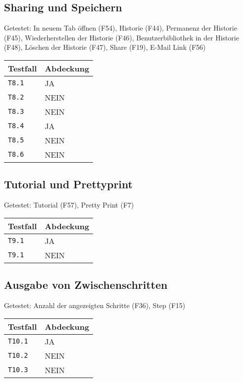 \documentclass[parskip=full,11pt,twoside]{scrartcl}
\newcommand{\testline}[2]{
    \texttt{#1} & \ifthenelse{\equal{#2}{JA}}{\cellcolor{green!20}}{\cellcolor{red!20}}#2 \\ \hline
}
\begin{document}
\subsection{Sharing und Speichern}
    Getestet:
    In neuem Tab öffnen (F54),
    Historie (F44),
    Permanenz der Historie (F45),
    Wiederherstellen der Historie (F46),
    Benutzerbibliothek in der Historie (F48),
    Löschen der Historie (F47),
    Share (F19),
    E-Mail Link (F56)

    \label{shortcuts}
    \begin{center}
        \begin{tabular}{ p{9cm} p{4cm}}
            Testfall & Abdeckung \\ \hline
            \testline{T8.1}{JA}
            \testline{T8.2}{NEIN}
            \testline{T8.3}{NEIN}
            \testline{T8.4}{JA}
            \testline{T8.5}{NEIN}
            \testline{T8.6}{NEIN}
        \end{tabular}
    \end{center}

\subsection{Tutorial und Prettyprint}
    Getestet:
    Tutorial (F57),
    Pretty Print (F7)

    \label{shortcuts}
    \begin{center}
        \begin{tabular}{ p{9cm} p{4cm}}
            Testfall & Abdeckung \\ \hline
            \testline{T9.1}{JA}
            \testline{T9.1}{NEIN}
        \end{tabular}
    \end{center}

\subsection{Ausgabe von Zwischenschritten}
    Getestet:
    Anzahl der angezeigten Schritte (F36),
    Step (F15)

    \label{shortcuts}
    \begin{center}
        \begin{tabular}{ p{9cm} p{4cm}}
            Testfall & Abdeckung \\ \hline
            \testline{T10.1}{JA}
            \testline{T10.2}{NEIN}
            \testline{T10.3}{NEIN}
        \end{tabular}
    \end{center}
\end{document}
